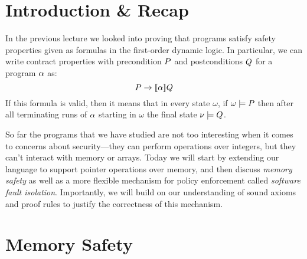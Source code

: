 \documentclass[11pt,twoside]{scrartcl}
\begin{document}
\newcommand{\atrace}{\sigma}%
\newcommand{\stdI}{\dTLint[state=\omega]}%
\newcommand{\Ip}{\dTLint[trace=\atrace]}%
\newcommand{\ws}{\omega}\newcommand{\wt}{\nu}%

\maketitle
\thispagestyle{empty}


\section{Introduction \& Recap}

In the previous lecture we looked into proving that programs satisfy safety properties given as formulas in the first-order dynamic logic. In particular, we can write contract properties with precondition $P$ and postconditions $Q$ for a program $\alpha$ as:
\begin{equation}
\ausfml \limply \dbox{\asprg}{\busfml}
\end{equation}
If this formula is valid, then it means that in every state $\omega$, if $\omega\models P$ then after all terminating runs of $\alpha$ starting in $\omega$ the final state $\nu\models Q$. 

So far the programs that we have studied are not too interesting when it comes to concerns about security---they can perform operations over integers, but they can't interact with memory or arrays. 
Today we will start by extending our language to support pointer operations over memory, and then discuss \emph{memory safety} as well as a more flexible mechanism for policy enforcement called \emph{software fault isolation}. Importantly, we will build on our understanding of sound axioms and proof rules to justify the correctness of this mechanism.

\section{Memory Safety}
\end{document}
